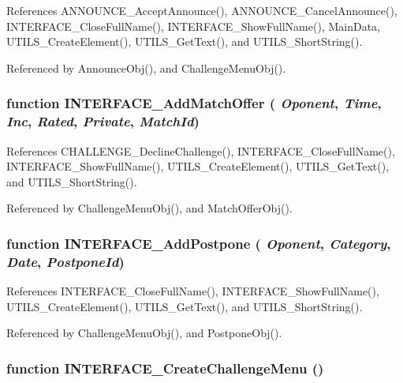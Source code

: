 References ANNOUNCE\_\-AcceptAnnounce(), ANNOUNCE\_\-CancelAnnounce(), INTERFACE\_\-CloseFullName(), INTERFACE\_\-ShowFullName(), MainData, UTILS\_\-CreateElement(), UTILS\_\-GetText(), and UTILS\_\-ShortString().

Referenced by AnnounceObj(), and ChallengeMenuObj().
\subsubsection[INTERFACE\_\-AddMatchOffer]{\setlength{\rightskip}{0pt plus 5cm}function INTERFACE\_\-AddMatchOffer ( {\em Oponent}, \/   {\em Time}, \/   {\em Inc}, \/   {\em Rated}, \/   {\em Private}, \/   {\em MatchId})}\label{challengemenu_8js_104addc387279d4c795a19fa007ebabf}




References CHALLENGE\_\-DeclineChallenge(), INTERFACE\_\-CloseFullName(), INTERFACE\_\-ShowFullName(), UTILS\_\-CreateElement(), UTILS\_\-GetText(), and UTILS\_\-ShortString().

Referenced by ChallengeMenuObj(), and MatchOfferObj().
\subsubsection[INTERFACE\_\-AddPostpone]{\setlength{\rightskip}{0pt plus 5cm}function INTERFACE\_\-AddPostpone ( {\em Oponent}, \/   {\em Category}, \/   {\em Date}, \/   {\em PostponeId})}\label{challengemenu_8js_74a01bd2dc43ff0fb375c9637a85d669}




References INTERFACE\_\-CloseFullName(), INTERFACE\_\-ShowFullName(), UTILS\_\-CreateElement(), UTILS\_\-GetText(), and UTILS\_\-ShortString().

Referenced by ChallengeMenuObj(), and PostponeObj().
\subsubsection[INTERFACE\_\-CreateChallengeMenu]{\setlength{\rightskip}{0pt plus 5cm}function INTERFACE\_\-CreateChallengeMenu ()}\label{challengemenu_8js_54bc5ea57f3cfab2db1e90f65fc2a159}




